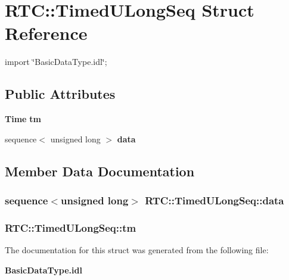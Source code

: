 \section{RTC::TimedULongSeq Struct Reference}
\label{structRTC_1_1TimedULongSeq}


{\ttfamily import \char`\"{}BasicDataType.idl\char`\"{};}

\subsection*{Public Attributes}
\begin{DoxyCompactItemize}
\item 
{\bf Time} {\bf tm}
\item 
sequence$<$ unsigned long $>$ {\bf data}
\end{DoxyCompactItemize}


\subsection{Member Data Documentation}
\subsubsection[{data}]{\setlength{\rightskip}{0pt plus 5cm}sequence$<$unsigned long$>$ {\bf RTC::TimedULongSeq::data}}\label{structRTC_1_1TimedULongSeq_af252ccd0ee4dcc6eb9e0690f20ca998f}
\subsubsection[{tm}]{ {\bf RTC::TimedULongSeq::tm}}\label{structRTC_1_1TimedULongSeq_ad6641cf65f9493ae41641ad5b9e9a363}


The documentation for this struct was generated from the following file:\begin{DoxyCompactItemize}
\item 
{\bf BasicDataType.idl}\end{DoxyCompactItemize}
